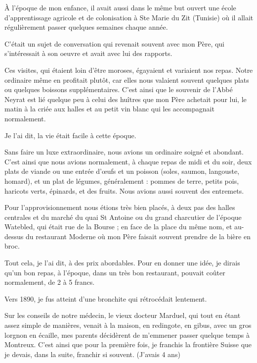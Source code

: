 \documentclass[11pt,a4paper]{report}
\begin{document}
À l'époque de mon enfance, il avait aussi dans le même but ouvert une école d'apprentissage agricole et de colonisation à Ste Marie du Zit (Tunisie) où il allait régulièrement passer quelques semaines chaque année.

C'était un sujet de conversation qui revenait souvent avec mon Père, qui s'intéressait à son oeuvre et avait avec lui des rapports.

Ces visites, qui étaient loin d'être moroses, égayaient et variaient nos repas. Notre ordinaire même en profitait plutôt, car elles nous valaient souvent quelques plats ou quelques boissons supplémentaires. C'est ainsi que le souvenir de l'Abbé Neyrat est lié quelque peu à celui des huîtres que mon Père achetait pour lui, le matin à la criée aux halles et au petit vin blanc qui les accompagnait normalement.

Je l'ai dit, la vie était facile à cette époque.

Sans faire un luxe extraordinaire, nous avions un ordinaire soigné et abondant. C'est ainsi que nous avions normalement, à chaque repas de midi et du soir, deux plats de viande ou une entrée d'œufs et un poisson (soles, saumon, langouste, homard), et un plat de légumes, généralement : pommes de terre, petits pois, haricots verts, épinards, et des fruits. Nous avions aussi souvent des entremets.

Pour l'approvisionnement nous étions très bien placés, à deux pas des halles centrales et du marché du quai St Antoine ou du grand charcutier de l'époque Watebled, qui était rue de la Bourse ; en face de la place du même nom, et au-dessus du restaurant Moderne où mon Père faisait souvent prendre de la bière en broc.

Tout cela, je l'ai dit, à des prix abordables. Pour en donner une idée, je dirais qu'un bon repas, à l'époque, dans un très bon restaurant, pouvait coûter normalement, de 2 à 5 francs.

Vers 1890, je fus atteint d'une bronchite qui rétrocédait lentement.

Sur les conseils de notre médecin, le vieux docteur Marduel, qui tout en étant assez simple de manières, venait à la maison, en redingote, en gibus, avec un gros lorgnon en écaille, mes parents décidèrent de m'emmener passer quelque temps à Montreux. C'est ainsi que pour la première fois, je franchis la frontière Suisse que je devais, dans la suite, franchir si souvent. (J'avais 4 ans)
\end{document}
